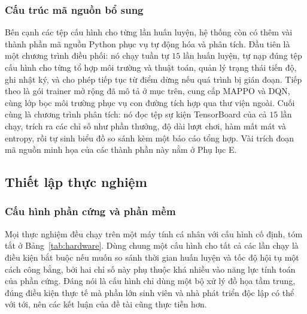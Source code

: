 \subsubsection{Cấu trúc mã nguồn bổ sung}
\label{sub:codestruct}
\indent Bên cạnh các tệp cấu hình cho từng lần huấn luyện, hệ thống còn có thêm vài thành
phần mã nguồn Python phục vụ tự động hóa và phân tích. Đầu tiên là một chương trình điều
phối: nó chạy tuần tự $15$ lần huấn luyện, tự nạp đúng tệp cấu hình cho từng tổ hợp môi
trường và thuật toán, quản lý trạng thái tiến độ, ghi nhật ký, và cho phép tiếp tục từ
điểm dừng nếu quá trình bị gián đoạn. Tiếp theo là gói trainer mở rộng đã mô tả ở mục trên,
cung cấp MAPPO và DQN, cùng lớp bọc môi trường phục vụ con đường tích hợp qua thư viện
ngoài. Cuối cùng là chương trình phân tích: nó đọc tệp sự kiện TensorBoard của cả $15$ lần
chạy, trích ra các chỉ số như phần thưởng, độ dài lượt chơi, hàm mất mát và entropy,
rồi tự sinh biểu đồ so sánh kèm một báo cáo tổng hợp. Vài trích đoạn mã nguồn minh họa của
các thành phần này nằm ở Phụ lục E.

\subsection{Thiết lập thực nghiệm}
\label{sub:experiment-setup}

\subsubsection{Cấu hình phần cứng và phần mềm}
\label{sub:hardware}
\indent Mọi thực nghiệm đều chạy trên một máy tính cá nhân với cấu hình cố định, tóm tắt ở
Bảng~\ref{tab:hardware}. Dùng chung một cấu hình cho tất cả các lần chạy là điều kiện bắt
buộc nếu muốn so sánh thời gian huấn luyện và tốc độ hội tụ một cách công bằng, bởi hai chỉ
số này phụ thuộc khá nhiều vào năng lực tính toán của phần cứng. Đáng nói là cấu hình chỉ
dùng một bộ xử lý đồ họa tầm trung, đúng điều kiện thực tế mà phần lớn sinh viên và nhà phát
triển độc lập có thể với tới, nên các kết luận của đề tài cũng thực tiễn hơn.


